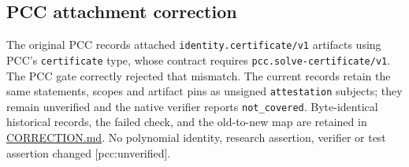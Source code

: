 \documentclass[
  10pt,
]{article}
\begin{document}
\subsection{PCC attachment correction}\label{pcc-attachment-correction}

The original PCC records attached \texttt{identity.certificate/v1}
artifacts using PCC's \texttt{certificate} type, whose contract requires
\texttt{pcc.solve-certificate/v1}. The PCC gate correctly rejected that
mismatch. The current records retain the same statements, scopes and
artifact pins as unsigned \texttt{attestation} subjects; they remain
unverified and the native verifier reports \texttt{not\_covered}.
Byte-identical historical records, the failed check, and the old-to-new
map are retained in \url{CORRECTION.md}. No polynomial identity,
research assertion, verifier or test assertion changed
{[}pcc:unverified{]}.
\end{document}
